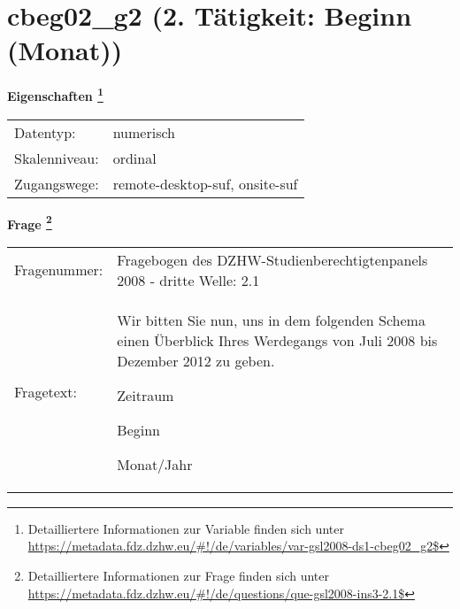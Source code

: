 
    \setcounter{footnote}{0}

    \vspace*{-1.8cm}
	\section{cbeg02\_g2 (2. Tätigkeit: Beginn (Monat))}
	\label{section:cbeg02_g2}



    \vspace*{0.5cm}
    \noindent\textbf{Eigenschaften
	\footnote{Detailliertere Informationen zur Variable finden sich unter
		\url{https://metadata.fdz.dzhw.eu/\#!/de/variables/var-gsl2008-ds1-cbeg02_g2$}}}\\
	\begin{tabularx}{\hsize}{@{}lX}
	Datentyp: & numerisch \\
	Skalenniveau: & ordinal \\
	Zugangswege: &
	  remote-desktop-suf, 
	  onsite-suf
 \\
    \end{tabularx}



				\vspace*{0.5cm}
                \noindent\textbf{Frage
	                \footnote{Detailliertere Informationen zur Frage finden sich unter
		              \url{https://metadata.fdz.dzhw.eu/\#!/de/questions/que-gsl2008-ins3-2.1$}}}\\
				\begin{tabularx}{\hsize}{@{}lX}
					Fragenummer: &
					  Fragebogen des DZHW-Studienberechtigtenpanels 2008 - dritte Welle:
					  2.1
 \\
					Fragetext: & Wir bitten Sie nun, uns in dem folgenden Schema einen Überblick Ihres Werdegangs von Juli 2008 bis Dezember 2012 zu geben.\par  Zeitraum\par  Beginn\par  Monat/Jahr \\
				\end{tabularx}





